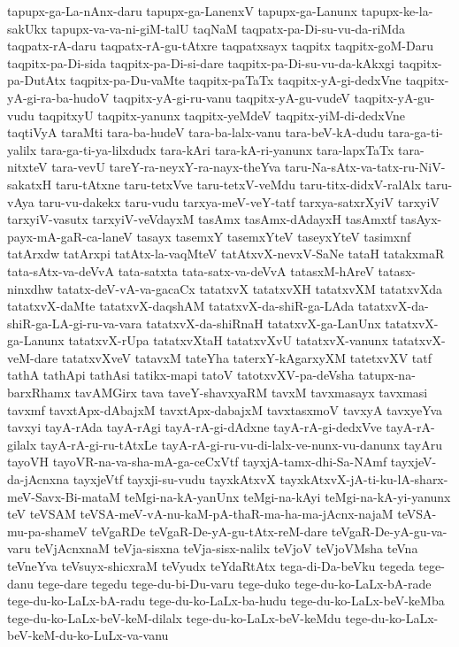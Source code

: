 {tapupx-ga-La-nAnx-daru
tapupx-ga-LanenxV
tapupx-ga-Lanunx
tapupx-ke-la-sakUkx
tapupx-va-va-ni-giM-talU
taqNaM
taqpatx-pa-Di-su-vu-da-riMda
taqpatx-rA-daru
taqpatx-rA-gu-tAtxre
taqpatxsayx
taqpitx
taqpitx-goM-Daru
taqpitx-pa-Di-sida
taqpitx-pa-Di-si-dare
taqpitx-pa-Di-su-vu-da-kAkxgi
taqpitx-pa-DutAtx
taqpitx-pa-Du-vaMte
taqpitx-paTaTx
taqpitx-yA-gi-dedxVne
taqpitx-yA-gi-ra-ba-hudoV
taqpitx-yA-gi-ru-vanu
taqpitx-yA-gu-vudeV
taqpitx-yA-gu-vudu
taqpitxyU
taqpitx-yanunx
taqpitx-yeMdeV
taqpitx-yiM-di-dedxVne
taqtiVyA
taraMti
tara-ba-hudeV
tara-ba-lalx-vanu
tara-beV-kA-dudu
tara-ga-ti-yalilx
tara-ga-ti-ya-lilxdudx
tara-kAri
tara-kA-ri-yanunx
tara-lapxTaTx
tara-nitxteV
tara-vevU
tareY-ra-neyxY-ra-nayx-theYva
taru-Na-sAtx-va-tatx-ru-NiV-sakatxH
taru-tAtxne
taru-tetxVve
taru-tetxV-veMdu
taru-titx-didxV-ralAlx
taru-vAya
taru-vu-dakekx
taru-vudu
tarxya-meV-veY-tatf
tarxya-satxrXyiV
tarxyiV
tarxyiV-vasutx
tarxyiV-veVdayxM
tasAmx
tasAmx-dAdayxH
tasAmxtf
tasAyx-payx-mA-gaR-ca-laneV
tasayx
tasemxY
tasemxYteV
taseyxYteV
tasimxnf
tatArxdw
tatArxpi
tatAtx-la-vaqMteV
tatAtxvX-nevxV-SaNe
tataH
tatakxmaR
tata-sAtx-va-deVvA
tata-satxta
tata-satx-va-deVvA
tatasxM-hAreV
tatasx-ninxdhw
tatatx-deV-vA-va-gacaCx
tatatxvX
tatatxvXH
tatatxvXM
tatatxvXda
tatatxvX-daMte
tatatxvX-daqshAM
tatatxvX-da-shiR-ga-LAda
tatatxvX-da-shiR-ga-LA-gi-ru-va-vara
tatatxvX-da-shiRnaH
tatatxvX-ga-LanUnx
tatatxvX-ga-Lanunx
tatatxvX-rUpa
tatatxvXtaH
tatatxvXvU
tatatxvX-vanunx
tatatxvX-veM-dare
tatatxvXveV
tatavxM
tateYha
taterxY-kAgarxyXM
tatetxvXV
tatf
tathA
tathApi
tathAsi
tatikx-mapi
tatoV
tatotxvXV-pa-deVsha
tatupx-na-barxRhamx
tavAMGirx
tava
taveY-shavxyaRM
tavxM
tavxmasayx
tavxmasi
tavxmf
tavxtApx-dAbajxM
tavxtApx-dabajxM
tavxtasxmoV
tavxyA
tavxyeYva
tavxyi
tayA-rAda
tayA-rAgi
tayA-rA-gi-dAdxne
tayA-rA-gi-dedxVve
tayA-rA-gilalx
tayA-rA-gi-ru-tAtxLe
tayA-rA-gi-ru-vu-di-lalx-ve-nunx-vu-danunx
tayAru
tayoVH
tayoVR-na-va-sha-mA-ga-ceCxVtf
tayxjA-tamx-dhi-Sa-NAmf
tayxjeV-da-jAcnxna
tayxjeVtf
tayxji-su-vudu
tayxkAtxvX
tayxkAtxvX-jA-ti-ku-lA-sharx-meV-Savx-Bi-mataM
teMgi-na-kA-yanUnx
teMgi-na-kAyi
teMgi-na-kA-yi-yanunx
teV
teVSAM
teVSA-meV-vA-nu-kaM-pA-thaR-ma-ha-ma-jAcnx-najaM
teVSA-mu-pa-shameV
teVgaRDe
teVgaR-De-yA-gu-tAtx-reM-dare
teVgaR-De-yA-gu-va-varu
teVjAcnxnaM
teVja-sisxna
teVja-sisx-nalilx
teVjoV
teVjoVMsha
teVna
teVneYva
teVsuyx-shicxraM
teVyudx
teYdaRtAtx
tega-di-Da-beVku
tegeda
tege-danu
tege-dare
tegedu
tege-du-bi-Du-varu
tege-duko
tege-du-ko-LaLx-bA-rade
tege-du-ko-LaLx-bA-radu
tege-du-ko-LaLx-ba-hudu
tege-du-ko-LaLx-beV-keMba
tege-du-ko-LaLx-beV-keM-dilalx
tege-du-ko-LaLx-beV-keMdu
tege-du-ko-LaLx-beV-keM-du-ko-LuLx-va-vanu
}
